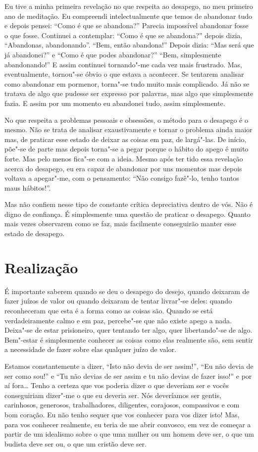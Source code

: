 Eu tive a minha primeira revelação no que respeita ao desapego, no meu primeiro
ano de meditação. Eu compreendi intelectualmente que temos de abandonar tudo e
depois pensei: “Como é que se abandona?” Parecia impossível abandonar fosse o
que fosse. Continuei a contemplar: “Como é que se abandona?” depois dizia,
“Abandonas, abandonando”. “Bem, então abandona!” Depois dizia: “Mas será que já
abandonei?” e “Como é que podes abandonar?” “Bem, simplesmente abandonando!” E
assim continuei tornando"-me cada vez mais frustrado. Mas, eventualmente,
tornou"-se óbvio o que estava a acontecer. Se tentarem analisar como abandonar em
pormenor, torna"-se tudo muito mais complicado. Já não se tratava de algo que
pudesse ser expresso por palavras, mas algo que simplesmente fazia. E assim por
um momento eu abandonei tudo, assim simplesmente.

No que respeita a problemas pessoais e obsessões, o método para o desapego é o
mesmo. Não se trata de analisar exaustivamente e tornar o problema ainda maior
mas, de praticar esse estado de deixar as coisas em paz, de largá"-las. De
início, põe"-se de parte mas depois torna"-se a pegar porque o hábito do apego é
muito forte. Mas pelo menos fica"-se com a ideia. Mesmo após ter tido essa
revelação acerca do desapego, eu era capaz de abandonar por uns momentos mas
depois voltava a apegar"-me, com o pensamento: “Não consigo fazê"-lo, tenho tantos
maus hábitos!”.

Mas não confiem nesse tipo de constante crítica depreciativa dentro de vós. Não
é digno de confiança. É simplesmente uma questão de praticar o desapego. Quanto
mais vezes observarem como se faz, mais facilmente conseguirão manter esse
estado de desapego.

\section{Realização}

É importante saberem quando se deu o desapego do desejo, quando deixaram de
fazer juízos de valor ou quando deixaram de tentar livrar"-se deles: quando
reconheceram que esta é a forma como as coisas são. Quando se está
verdadeiramente calmo e em paz, percebe"-se que não existe apego a nada. Deixa"-se
de estar prisioneiro, quer tentando ter algo, quer libertando"-se de algo.
Bem"-estar é simplesmente conhecer as coisas como elas realmente são, sem sentir
a necessidade de fazer sobre elas qualquer juízo de valor.

Estamos constantemente a dizer, “Isto não devia de ser assim!”, “Eu não devia de
ser como sou!” e “Tu não devias de ser assim e tu não devias de fazer isso!” e
por aí fora\ldots{} Tenho a certeza que vos poderia dizer o que deveriam ser e
vocês conseguiriam dizer"-me o que eu deveria ser. Nós deveríamos ser gentis,
carinhosos, generosos, trabalhadores, diligentes, corajosos, compassivos e com
bom coração. Eu não tenho sequer que vos conhecer para vos dizer isto! Mas, para
vos conhecer realmente, eu teria de me abrir convosco, em vez de começar a
partir de um idealismo sobre o que uma mulher ou um homem deve ser, o que um
budista deve ser ou, o que um cristão deve ser.

